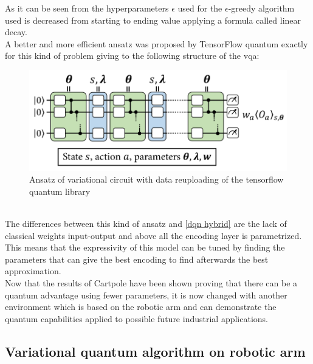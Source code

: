 As it can be seen from the hyperparameters $\epsilon$ used for the $\epsilon$-greedy algorithm used is decreased from starting to ending value applying a formula called linear decay.\\
A better and more efficient ansatz was proposed by TensorFlow quantum exactly for this kind of problem giving to the following structure of the \acrlong{vqa}:
\begin{figure}[h]
	\centering
	\includegraphics[width=0.8\linewidth]{img/tfq}
	\caption{Ansatz of variational circuit with data reuploading of the tensorflow quantum library}
	\label{fig:tfq}
\end{figure}\\
The differences between this kind of ansatz and \ref{dqn hybrid} are the lack of classical weights input-output and above all the encoding layer is parametrized. This means that the expressivity of this model can be tuned by finding the parameters that can give the best encoding to find afterwards the best approximation.\\
Now that the results of Cartpole have been shown proving that there can be a quantum advantage using fewer parameters, it is now changed with another environment which is based on the robotic arm and can demonstrate the quantum capabilities applied to possible future industrial applications.
\subsection{Variational quantum algorithm on robotic arm}
